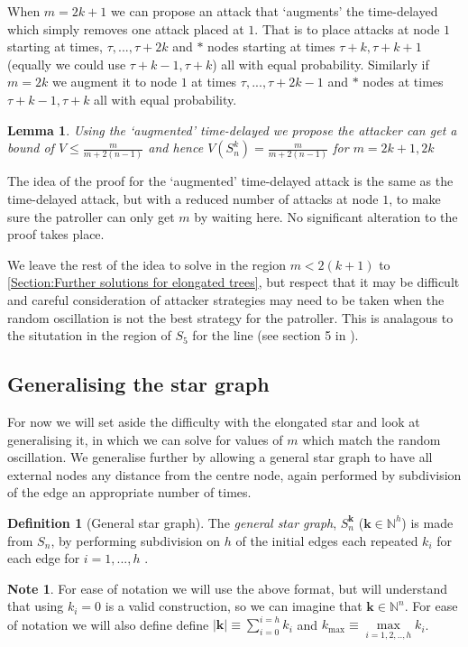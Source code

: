 \documentclass[a4paper,10pt]{article}
\newtheorem{lemma}[theorem]{Lemma}
\theoremstyle{definition}
\newtheorem{definition}[theorem]{Definition}
\theoremstyle{definition}
\theoremstyle{remark}
\theoremstyle{definition}
\newtheorem*{note}{Note}
\begin{document}
When $m=2k+1$ we can propose an attack that `augments' the time-delayed which simply removes one attack placed at $1$. That is to place attacks at node $1$ starting at times, $\tau,...,\tau+2k$ and $*$ nodes starting at times $\tau+k,\tau+k+1$ (equally we could use $\tau+k-1,\tau+k$) all with equal probability. Similarly if $m=2k$ we augment it to node $1$ at times $\tau,...,\tau+2k-1$ and $*$ nodes at times $\tau+k-1,\tau+k$ all with equal probability.

\begin{lemma}
Using the `augmented' time-delayed we propose the attacker can get a bound of $V \leq \frac{m}{m+2(n-1)}$ and hence $V(S_{n}^{k})=\frac{m}{m+2(n-1)}$ for $m=2k+1,2k$
\end{lemma}

The idea of the proof for the `augmented' time-delayed attack is the same as the time-delayed attack, but with a reduced number of attacks at node $1$, to make sure the patroller can only get $m$ by waiting here. No significant alteration to the proof takes place.

We leave the rest of the idea to solve in the region $m < 2(k+1)$ to \ref{Section:Further solutions for elongated trees}, but respect that it may be difficult and careful consideration of attacker strategies may need to be taken when the random oscillation is not the best strategy for the patroller. This is analagous to the situtation in the region of $S_{5}$ for the line (see section 5 in \cite{Lin2013}).

\subsection{Generalising the star graph}
For now we will set aside the difficulty with the elongated star and look at generalising it, in which we can solve for values of $m$ which match the random oscillation. We generalise further by allowing a general star graph to have all external nodes any distance from the centre node, again performed by subdivision of the edge an appropriate number of times.

\begin{definition}[General star graph]
The \textit{general star graph}, $S^{\bm{k}}_{n}$ ($\bm{k} \in \mathbb{N}^{h}$) is made from $S_{n}$, by performing subdivision on $h$ of the  initial edges each repeated $k_{i}$ for each edge for $i=1,...,h$ . 
\end{definition}

\begin{note}
For ease of notation we will use the above format, but will understand that using $k_{i}=0$ is a valid construction, so we can imagine that $\bm{k} \in \mathbb{N}^n$.
For ease of notation we will also define define $ |\bm{k}| \equiv \sum\limits_{i=0}^{i=h} k_{i}$ and $ k_{\max} \equiv \max\limits_{i=1,2,..,h} k_{i}$.
\end{note}
\end{document}
